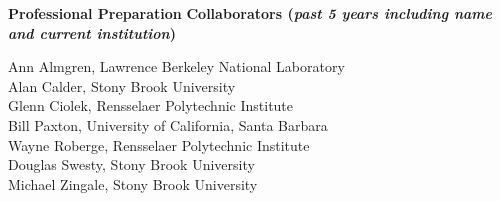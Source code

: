 \documentclass[11pt,letterpaper,english]{article}
\begin{document}
\begin{flushleft} {\bf Professional Preparation}
\vspace{-6pt}
{\bf Collaborators ({\emph{past 5 years including name and current institution}})} 
{\parindent 16pt

Ann Almgren, Lawrence Berkeley National Laboratory\\ 
Alan Calder, Stony Brook University\\
Glenn Ciolek, Rensselaer Polytechnic Institute\\
Bill Paxton, University of California, Santa Barbara\\
Wayne Roberge, Rensselaer Polytechnic Institute\\
Douglas Swesty, Stony Brook University\\
Michael Zingale, Stony Brook University\\
}


\end{flushleft}
\end{document}
